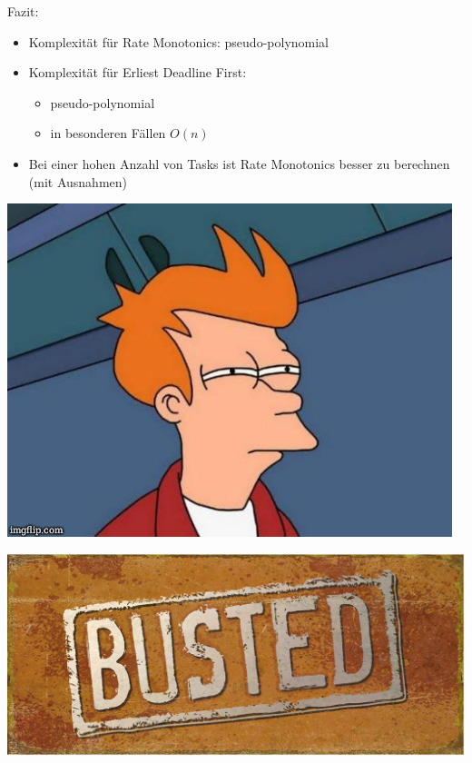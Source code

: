 \begin{frame}{\subsecname}
	Fazit:
	\begin{itemize}
		\item Komplexität für Rate Monotonics: pseudo-polynomial
		\item Komplexität für Erliest Deadline First:
		\begin{itemize}
			\item pseudo-polynomial
			\item in besonderen Fällen $O(n)$
		\end{itemize}
		\item Bei einer hohen Anzahl von Tasks ist Rate Monotonics besser zu berechnen (mit Ausnahmen)
	\end{itemize}
\end{frame}

\begin{frame}{\subsecname}
	\begin{center}
			\includegraphics[scale=.4]{graphics/memes/fry.jpg}
	\end{center}
\end{frame}

\begin{frame}{\subsecname}
	\begin{center}
			\includegraphics[scale=1]{graphics/memes/busted.jpg}
	\end{center}
\end{frame}


